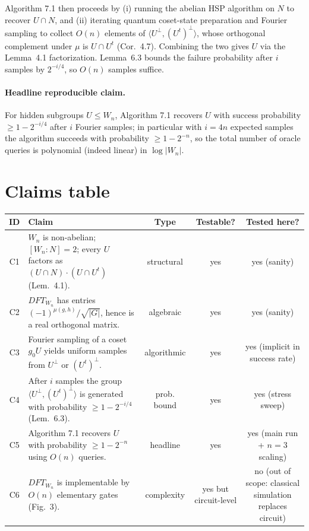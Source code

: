 \documentclass[11pt]{article}
\begin{document}
Algorithm 7.1 then proceeds by (i) running the abelian HSP algorithm on
$N$ to recover $U \cap N$, and (ii) iterating quantum coset-state
preparation and Fourier sampling to collect $O(n)$ elements of
$\langle U^{\perp}, (U^t)^{\perp}\rangle$, whose orthogonal complement
under $\mu$ is $U \cap U^t$ (Cor.\ 4.7). Combining the two gives $U$ via
the Lemma~4.1 factorization. Lemma~6.3 bounds the failure probability
after $i$ samples by $2^{-i/4}$, so $O(n)$ samples suffice.

\paragraph{Headline reproducible claim.}
For hidden subgroups $U \le W_n$, Algorithm 7.1 recovers $U$ with success
probability $\ge 1 - 2^{-i/4}$ after $i$ Fourier samples; in particular
with $i = 4n$ expected samples the algorithm succeeds with probability
$\ge 1 - 2^{-n}$, so the total number of oracle queries is polynomial
(indeed linear) in $\log|W_n|$.

\section{Claims table}
\begin{center}
\begin{tabular}{clccc}
\toprule
ID & Claim & Type & Testable? & Tested here? \\
\midrule
C1 & $W_n$ is non-abelian; $[W_n{:}N] = 2$; every $U$ factors as $(U\cap N)\cdot(U\cap U^t)$ (Lem.~4.1). & structural & yes & yes (sanity) \\
C2 & $DFT_{W_n}$ has entries $(-1)^{\mu(g,h)}/\sqrt{|G|}$, hence is a real orthogonal matrix. & algebraic & yes & yes (sanity) \\
C3 & Fourier sampling of a coset $g_0 U$ yields uniform samples from $U^{\perp}$ or $(U^t)^{\perp}$. & algorithmic & yes & yes (implicit in success rate) \\
C4 & After $i$ samples the group $\langle U^{\perp}, (U^t)^{\perp}\rangle$ is generated with probability $\ge 1 - 2^{-i/4}$ (Lem.~6.3). & prob. bound & yes & yes (stress sweep) \\
C5 & Algorithm 7.1 recovers $U$ with probability $\ge 1 - 2^{-n}$ using $O(n)$ queries. & headline & yes & yes (main run + $n{=}3$ scaling) \\
C6 & $DFT_{W_n}$ is implementable by $O(n)$ elementary gates (Fig.~3). & complexity & yes but circuit-level & no (out of scope: classical simulation replaces circuit) \\
\bottomrule
\end{tabular}
\end{center}
\end{document}
